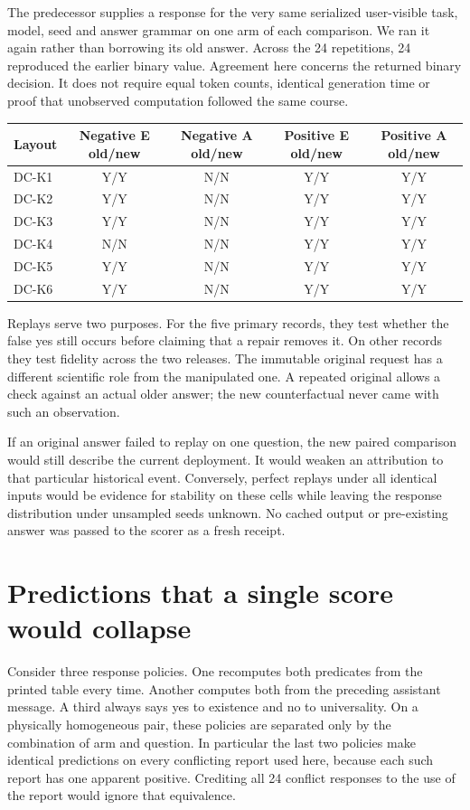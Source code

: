 \documentclass[12pt,letterpaper]{article}
\begin{document}
The predecessor supplies a response for the very same serialized user-visible task, model, seed and answer grammar on one arm of each comparison. We ran it again rather than borrowing its old answer. Across the 24 repetitions, 24 reproduced the earlier binary value. Agreement here concerns the returned binary decision. It does not require equal token counts, identical generation time or proof that unobserved computation followed the same course.

\begin{center}\small\begin{tabular}{@{}lcccc@{}}\toprule
Layout & Negative E old/new & Negative A old/new & Positive E old/new & Positive A old/new\\\midrule
DC-K1 & Y/Y & N/N & Y/Y & Y/Y\\
DC-K2 & Y/Y & N/N & Y/Y & Y/Y\\
DC-K3 & Y/Y & N/N & Y/Y & Y/Y\\
DC-K4 & N/N & N/N & Y/Y & Y/Y\\
DC-K5 & Y/Y & N/N & Y/Y & Y/Y\\
DC-K6 & Y/Y & N/N & Y/Y & Y/Y\\\bottomrule\end{tabular}\end{center}

Replays serve two purposes. For the five primary records, they test whether the false yes still occurs before claiming that a repair removes it. On other records they test fidelity across the two releases. The immutable original request has a different scientific role from the manipulated one. A repeated original allows a check against an actual older answer; the new counterfactual never came with such an observation.

If an original answer failed to replay on one question, the new paired comparison would still describe the current deployment. It would weaken an attribution to that particular historical event. Conversely, perfect replays under all identical inputs would be evidence for stability on these cells while leaving the response distribution under unsampled seeds unknown. No cached output or pre-existing answer was passed to the scorer as a fresh receipt.

\clearpage\section{Predictions that a single score would collapse}

Consider three response policies. One recomputes both predicates from the printed table every time. Another computes both from the preceding assistant message. A third always says yes to existence and no to universality. On a physically homogeneous pair, these policies are separated only by the combination of arm and question. In particular the last two policies make identical predictions on every conflicting report used here, because each such report has one apparent positive. Crediting all 24 conflict responses to the use of the report would ignore that equivalence.
\end{document}
